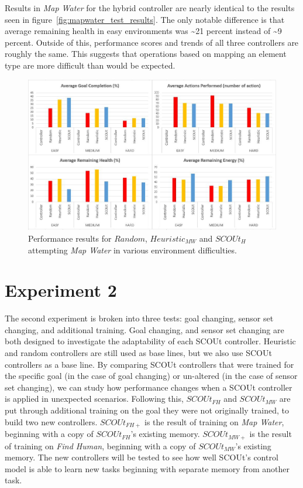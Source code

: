 Results in \textit{Map Water} for the hybrid controller are nearly identical to the results seen in figure~\ref{fig:mapwater_test_results}.
The only notable difference is that average remaining health in easy environments was \textasciitilde21 percent instead of \textasciitilde9 percent.
Outside of this, performance scores and trends of all three controllers are roughly the same.
This suggests that operations based on mapping an element type are more difficult than would be expected.

\begin{figure}[H]
  \includegraphics[width=1.0\columnwidth]{Figures/Results/Experiment1/HybridMapWater.JPG}
  \caption{Performance results for $Random$, $Heuristic_{MW}$ and $SCOUt_{H}$ attempting \textit{Map Water} in various environment difficulties.}
  \label{fig:hybrid_mapwater_test_results}
\end{figure}


\section{Experiment 2} \label{sec:experiment2}
The second experiment is broken into three tests: goal changing, sensor set changing, and additional training.
Goal changing, and sensor set changing are both designed to investigate the adaptability of each SCOUt controller.
Heuristic and random controllers are still used as base lines, but we also use SCOUt controllers as a base line.
By comparing SCOUt controllers that were trained for the specific goal (in the case of goal changing) or un-altered (in the case of sensor set changing), we can study how performance changes when a SCOUt controller is applied in unexpected scenarios.
Following this, $SCOUt_{FH}$ and $SCOUt_{MW}$ are put through additional training on the goal they were not originally trained, to build two new controllers.
$SCOUt_{FH+}$ is the result of training on \textit{Map Water}, beginning with a copy of $SCOUt_{FH}$'s existing memory.
$SCOUt_{MW+}$ is the result of training on \textit{Find Human}, beginning with a copy of $SCOUt_{MW}$'s existing memory.
The new controllers will be tested to see how well SCOUt's control model is able to learn new tasks beginning with separate memory from another task.


